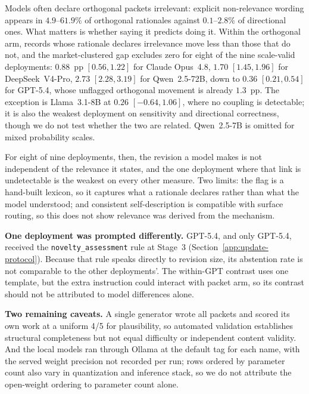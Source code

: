 Models often declare orthogonal packets irrelevant: explicit non-relevance wording appears in
$4.9$--$61.9\%$ of orthogonal rationales against $0.1$--$2.8\%$ of directional
ones. What matters is whether saying it predicts doing it. Within the orthogonal
arm, records whose rationale declares irrelevance move less than those that do not,
and the market-clustered gap excludes zero for eight of the nine scale-valid
deployments: $0.88$~pp $[0.56,1.22]$ for Claude Opus~4.8, $1.70$
$[1.45,1.96]$ for DeepSeek~V4-Pro, $2.73$ $[2.28,3.19]$ for Qwen~2.5-72B, down to
$0.36$ $[0.21,0.54]$ for GPT-5.4, whose unflagged orthogonal movement is already
$1.3$~pp. The exception is Llama~3.1-8B at $0.26$ $[-0.64,1.06]$, where no coupling is
detectable; it is also the weakest deployment on sensitivity and directional
correctness, though we do not test whether the two are related. Qwen~2.5-7B is
omitted for mixed probability scales.

For eight of nine deployments, then, the revision a model makes is not independent
of the relevance it states, and the one deployment where that link is undetectable
is the weakest on every other measure. Two limits: the flag is a hand-built
lexicon, so it captures what a rationale declares rather than what the model
understood; and consistent self-description is compatible with surface routing, so
this does not show relevance was derived from the mechanism.

\textbf{One deployment was prompted differently.} GPT-5.4, and only GPT-5.4,
received the \texttt{novelty\_assessment} rule at Stage~3
(Section~\ref{app:update-protocol}).  Because that rule speaks directly to revision
size, its abstention rate is not comparable to the other deployments'. The
within-GPT contrast uses one template, but the extra instruction could interact
with packet arm, so its contrast should not be attributed to model differences
alone.

\textbf{Two remaining caveats.} A single generator wrote all packets and scored its
own work at a uniform 4/5 for plausibility, so automated validation establishes
structural completeness but not equal difficulty or independent content validity.
And the local models ran through Ollama at the default tag for each name, with the
served weight precision not recorded per run; rows ordered by parameter count also
vary in quantization and inference stack, so we do not attribute the open-weight
ordering to parameter count alone.

